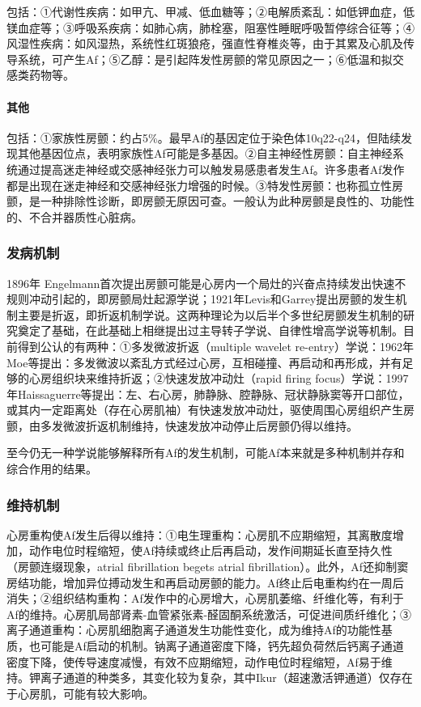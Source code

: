 包括：①代谢性疾病：如甲亢、甲减、低血糖等；②电解质紊乱：如低钾血症，低镁血症等；③呼吸系疾病：如肺心病，肺栓塞，阻塞性睡眠呼吸暂停综合征等；④风湿性疾病：如风湿热，系统性红斑狼疮，强直性脊椎炎等，由于其累及心肌及传导系统，可产生Af；⑤乙醇：是引起阵发性房颤的常见原因之一；⑥低温和拟交感类药物等。

\paragraph{其他}

包括：①家族性房颤：约占5\%。最早Af的基因定位于染色体10q22-q24，但陆续发现其他基因位点，表明家族性Af可能是多基因。②自主神经性房颤：自主神经系统通过提高迷走神经或交感神经张力可以触发易感患者发生Af。许多患者Af发作都是出现在迷走神经和交感神经张力增强的时候。③特发性房颤：也称孤立性房颤，是一种排除性诊断，即房颤无原因可查。一般认为此种房颤是良性的、功能性的、不合并器质性心脏病。

\subsubsection{发病机制}

1896年
Engelmann首次提出房颤可能是心房内一个局灶的兴奋点持续发出快速不规则冲动引起的，即房颤局灶起源学说；1921年Levis和Garrey提出房颤的发生机制主要是折返，即折返机制学说。这两种理论为以后半个多世纪房颤发生机制的研究奠定了基础，在此基础上相继提出过主导转子学说、自律性增高学说等机制。目前得到公认的有两种：①多发微波折返（multiple
wavelet
re-entry）学说：1962年Moe等提出：多发微波以紊乱方式经过心房，互相碰撞、再启动和再形成，并有足够的心房组织块来维持折返；②快速发放冲动灶（rapid
firing focus）学说：1997
年Haissaguerre等提出：左、右心房，肺静脉、腔静脉、冠状静脉窦等开口部位，或其内一定距离处（存在心房肌袖）有快速发放冲动灶，驱使周围心房组织产生房颤，由多发微波折返机制维持，快速发放冲动停止后房颤仍得以维持。

至今仍无一种学说能够解释所有Af的发生机制，可能Af本来就是多种机制并存和综合作用的结果。

\subsubsection{维持机制}

心房重构使Af发生后得以维持：①电生理重构：心房肌不应期缩短，其离散度增加，动作电位时程缩短，使Af持续或终止后再启动，发作间期延长直至持久性（房颤连缀现象，atrial
fibrillation begets atrial
fibrillation）。此外，Af还抑制窦房结功能，增加异位搏动发生和再启动房颤的能力。Af终止后电重构约在一周后消失；②组织结构重构：Af发作中的心房增大，心房肌萎缩、纤维化等，有利于Af的维持。心房肌局部肾素-血管紧张素-醛固酮系统激活，可促进间质纤维化；③离子通道重构：心房肌细胞离子通道发生功能性变化，成为维持Af的功能性基质，也可能是Af启动的机制。钠离子通道密度下降，钙先超负荷然后钙离子通道密度下降，使传导速度减慢，有效不应期缩短，动作电位时程缩短，Af易于维持。钾离子通道的种类多，其变化较为复杂，其中Ikur（超速激活钾通道）仅存在于心房肌，可能有较大影响。

